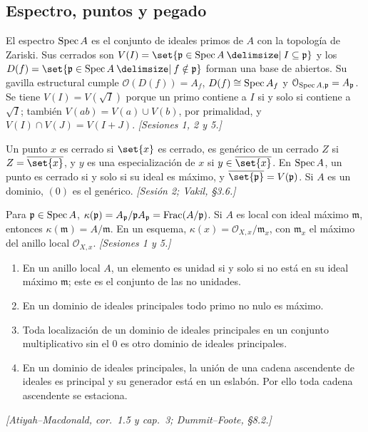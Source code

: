 \subsection{Espectro, puntos y pegado}

\begin{defi}
\label{defi:s09-espectro}
El espectro $\operatorname{Spec} A$ es el conjunto de ideales primos de $A$ con la topología de Zariski. Sus cerrados son $V(I)=\set{\mathfrak p\in\Spec A\given I\subseteq\mathfrak p}$ y los $D(f)=\set{\mathfrak p\in\Spec A\given f\notin\mathfrak p}$ forman una base de abiertos. Su gavilla estructural cumple $\mathcal O(D(f))=A_f$, $D(f)\cong\operatorname{Spec} A_f$ y $\mathcal O_{\operatorname{Spec} A,\mathfrak p}=A_{\mathfrak p}$. Se tiene $V(I)=V(\sqrt I)$ porque un primo contiene a $I$ si y solo si contiene a $\sqrt I$; también $V(ab)=V(a)\cup V(b)$, por primalidad, y $V(I)\cap V(J)=V(I+J)$. \emph{[Sesiones 1, 2 y 5.]}
\end{defi}

\begin{defi}
\label{defi:s09-especializaciones}
Un punto $x$ es cerrado si $\set{x}$ es cerrado, es genérico de un cerrado $Z$ si $Z=\overline{\set{x}}$, y $y$ es una especialización de $x$ si $y\in\overline{\set{x}}$. En $\operatorname{Spec} A$, un punto es cerrado si y solo si su ideal es máximo, y $\overline{\set{\mathfrak p}}=V(\mathfrak p)$. Si $A$ es un dominio, $(0)$ es el genérico. \emph{[Sesión 2; Vakil, \S3.6.]}
\end{defi}

\begin{defi}
\label{defi:s09-cuerpo-residual}
Para $\mathfrak p\in\operatorname{Spec} A$, $\kappa(\mathfrak p)=A_{\mathfrak p}/\mathfrak pA_{\mathfrak p}=\operatorname{Frac}(A/\mathfrak p)$. Si $A$ es local con ideal máximo $\mathfrak m$, entonces $\kappa(\mathfrak m)=A/\mathfrak m$. En un esquema, $\kappa(x)=\mathcal O_{X,x}/\mathfrak m_x$, con $\mathfrak m_x$ el máximo del anillo local $\mathcal O_{X,x}$. \emph{[Sesiones 1 y 5.]}
\end{defi}

\begin{prop}
\label{prop:s09-locales-dip}
\begin{enumerate}[label=(\alph*)]
\item En un anillo local $A$, un elemento es unidad si y solo si no está en su ideal máximo $\mathfrak m$; este es el conjunto de las no unidades.
\item En un dominio de ideales principales todo primo no nulo es máximo.
\item Toda localización de un dominio de ideales principales en un conjunto multiplicativo sin el $0$ es otro dominio de ideales principales.
\item En un dominio de ideales principales, la unión de una cadena ascendente de ideales es principal y su generador está en un eslabón. Por ello toda cadena ascendente se estaciona.
\end{enumerate}
\emph{[Atiyah--Macdonald, cor.~1.5 y cap.~3; Dummit--Foote, \S8.2.]}
\end{prop}

